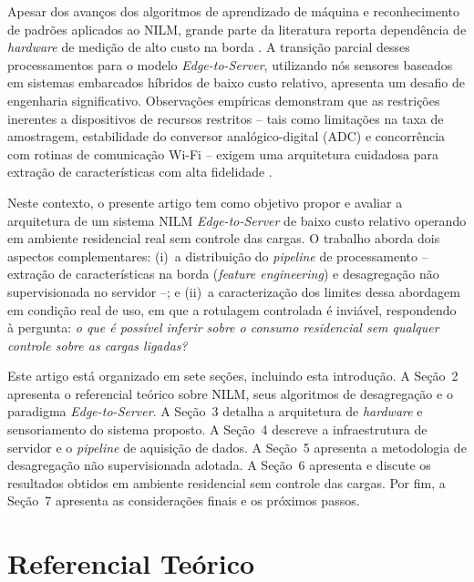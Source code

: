 \documentclass[12pt]{article}
\begin{document}
Apesar dos avan\c{c}os dos algoritmos de aprendizado de m\'aquina e reconhecimento
de padr\~oes aplicados ao NILM, grande parte da literatura reporta depend\^encia
de \textit{hardware} de medi\c{c}\~ao de alto custo na borda \citep{ref6,ref7}. A
transi\c{c}\~ao parcial desses processamentos para o modelo
\textit{Edge-to-Server}, utilizando n\'os sensores baseados em sistemas embarcados
h\'ibridos de baixo custo relativo, apresenta um desafio de engenharia
significativo. Observa\c{c}\~oes emp\'iricas demonstram que as restri\c{c}\~oes
inerentes a dispositivos de recursos restritos -- tais como limita\c{c}\~oes na
taxa de amostragem, estabilidade do conversor anal\'ogico-digital (ADC) e
concorr\^encia com rotinas de comunica\c{c}\~ao Wi-Fi -- exigem uma arquitetura
cuidadosa para extra\c{c}\~ao de caracter\'isticas com alta fidelidade
\citep{ref8}.

Neste contexto, o presente artigo tem como objetivo propor e avaliar a
arquitetura de um sistema NILM \textit{Edge-to-Server} de baixo custo relativo
operando em ambiente residencial real sem controle das cargas. O trabalho
aborda dois aspectos complementares: (i)~a distribui\c{c}\~ao do
\textit{pipeline} de processamento -- extra\c{c}\~ao de caracter\'isticas na
borda (\textit{feature engineering}) e desagrega\c{c}\~ao n\~ao supervisionada
no servidor --; e (ii)~a caracteriza\c{c}\~ao dos limites dessa abordagem em
condi\c{c}\~ao real de uso, em que a rotulagem controlada \'e invi\'avel,
respondendo \`a pergunta: \textit{o que \'e poss\'ivel inferir sobre o consumo
residencial sem qualquer controle sobre as cargas ligadas?}

Este artigo est\'a organizado em sete se\c{c}\~oes, incluindo esta introdu\c{c}\~ao.
A Se\c{c}\~ao~2 apresenta o referencial te\'orico sobre NILM, seus algoritmos de
desagrega\c{c}\~ao e o paradigma \textit{Edge-to-Server}. A Se\c{c}\~ao~3 detalha
a arquitetura de \textit{hardware} e sensoriamento do sistema proposto. A
Se\c{c}\~ao~4 descreve a infraestrutura de servidor e o \textit{pipeline} de
aquisi\c{c}\~ao de dados. A Se\c{c}\~ao~5 apresenta a metodologia de
desagrega\c{c}\~ao n\~ao supervisionada adotada. A Se\c{c}\~ao~6 apresenta e
discute os resultados obtidos em ambiente residencial sem controle das cargas.
Por fim, a Se\c{c}\~ao~7 apresenta as considera\c{c}\~oes finais e os pr\'oximos
passos.


\section{Referencial Te\'orico}
\end{document}
